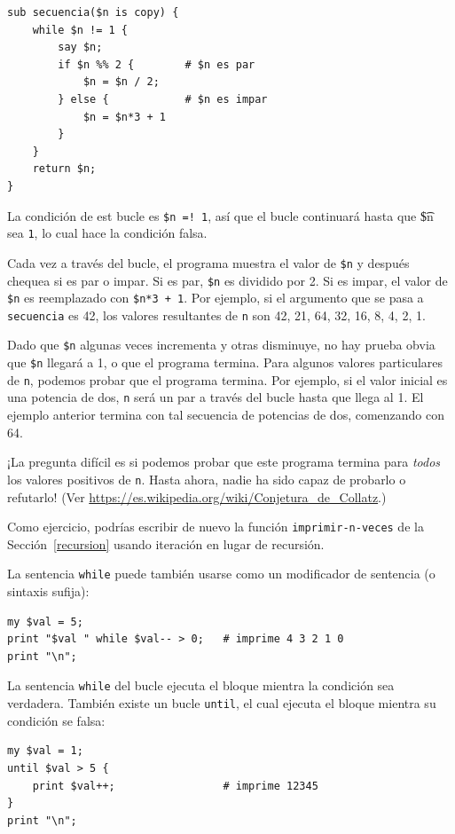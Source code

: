 \begin{verbatim}
sub secuencia($n is copy) {
    while $n != 1 {
        say $n;
        if $n %% 2 {        # $n es par
            $n = $n / 2;
        } else {            # $n es impar
            $n = $n*3 + 1
        }
    }
    return $n;
}
\end{verbatim}
%
La condición de est bucle es {\tt \$n =! 1}, así que el bucle continuará
hasta que {\t \$n} sea {\tt 1}, lo cual hace la condición falsa.

Cada vez a través del bucle, el programa muestra el valor de {\tt \$n}
y después chequea si es par o impar. Si es par, {\tt \$n} es dividido por 2.
Si es impar, el valor de {\tt \$n} es reemplazado con {\tt \$n*3 + 1}. Por ejemplo,
si el argumento que se pasa a {\tt secuencia} es 42, los valores resultantes
de {\tt n} son 42, 21, 64, 32, 16, 8, 4, 2, 1. 

Dado que {\tt \$n} algunas veces incrementa y otras disminuye, no hay prueba
obvia que {\tt \$n} llegará a 1, o que el programa termina. Para algunos valores
particulares de {\tt n}, podemos probar que el programa termina. Por ejemplo, si 
el valor inicial es una potencia de dos, {\tt n} será un par a través del bucle
hasta que llega al 1. El ejemplo anterior termina con tal secuencia de potencias
de dos, comenzando con 64.

¡La pregunta difícil es si podemos probar que este programa termina para 
{\em todos} los valores positivos de {\tt n}. Hasta ahora, nadie ha sido capaz
de probarlo o refutarlo! (Ver \url{https://es.wikipedia.org/wiki/Conjetura_de_Collatz}.)

Como ejercicio, podrías escribir de nuevo la función 
\verb|imprimir-n-veces| de la Sección~\ref{recursion}
usando iteración en lugar de recursión.

La sentencia {\tt while} puede también usarse como un modificador de sentencia (o sintaxis sufija):

\begin{verbatim}
my $val = 5;
print "$val " while $val-- > 0;   # imprime 4 3 2 1 0
print "\n";
\end{verbatim}

La sentencia {\tt while} del bucle ejecuta el bloque mientra la 
condición sea verdadera. También existe un bucle {\tt until},
el cual ejecuta el bloque mientra su condición se falsa:

\begin{verbatim}
my $val = 1;
until $val > 5 {
    print $val++;                 # imprime 12345
}
print "\n";
\end{verbatim}

